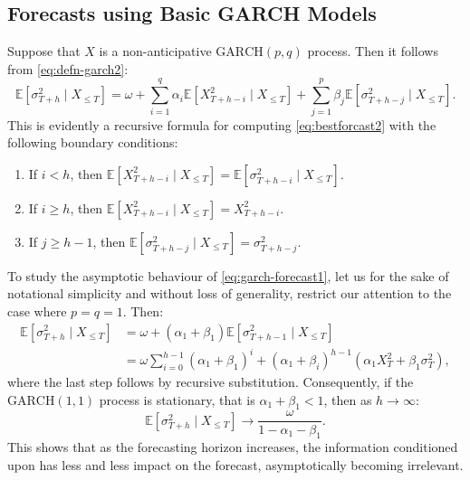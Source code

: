
\subsection{Forecasts using Basic GARCH Models}
Suppose that $X$ is a non-anticipative $\mathrm{GARCH}(p,q)$ process. Then it follows from \eqref{eq:defn-garch2}:
\begin{equation}\label{eq:garch-forecast1}
    \mathbb{E}[\sigma_{T+h}^{2}\mid X_{\leq T}]=\omega+\sum_{i=1}^{q}\alpha_{i}\mathbb{E}[X_{T+h-i}^{2}\mid X_{\leq T}]+\sum_{j=1}^{p}\beta_{j}\mathbb{E}[\sigma_{T+h-j}^{2}\mid X_{\leq T}].
\end{equation}
This is evidently a recursive formula for computing \eqref{eq:bestforcast2} with the following boundary conditions:
\begin{enumerate}[label=(\arabic*)]
    \item If $i<h$, then $\mathbb{E}[X_{T+h-i}^{2}\mid X_{\leq T}]=\mathbb{E}[\sigma_{T+h-i}^{2}\mid X_{\leq T}]$.
    \item If $i\geq h$, then $\mathbb{E}[X_{T+h-i}^{2}\mid X_{\leq T}]=X_{T+h-i}^{2}$.
    \item If $j\geq h-1$, then $\mathbb{E}[\sigma_{T+h-j}^{2}\mid X_{\leq T}]=\sigma_{T+h-j}^{2}$.
\end{enumerate}
To study the asymptotic behaviour of \eqref{eq:garch-forecast1}, let us for the sake of notational simplicity and without loss of generality, restrict our attention to the case where $p=q=1$. Then:
\begin{equation}\label{eq:garch-forecast2}
\begin{split}
    \mathbb{E}[\sigma_{T+h}^{2}\mid X_{\leq T}]&=\omega+(\alpha_{1}+\beta_{1})\mathbb{E}[\sigma_{T+h-1}^{2}\mid X_{\leq T}]\\
    &=\omega\sum_{i=0}^{h-1}(\alpha_{1}+\beta_{1})^{i}+(\alpha_{1}+\beta_{i})^{h-1}(\alpha_{1}X_{T}^{2}+\beta_{1}\sigma_{T}^{2}),
\end{split}
\end{equation}
where the last step follows by recursive substitution. Consequently, if the $\mathrm{GARCH}(1,1)$ process is stationary, that is $\alpha_{1}+\beta_{1}<1$, then as $h\to\infty$:
\begin{equation*}
    \mathbb{E}[\sigma_{T+h}^{2}\mid X_{\leq T}]\to\frac{\omega}{1-\alpha_{1}-\beta_{1}}.
\end{equation*}
This shows that as the forecasting horizon increases, the information conditioned upon has less and less impact on the forecast, asymptotically becoming irrelevant.

